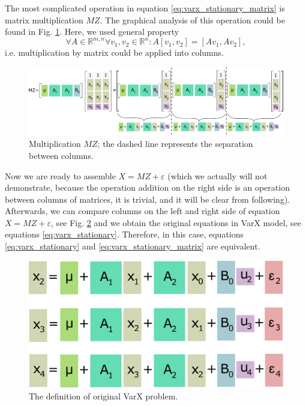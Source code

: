  The most complicated operation in equation \eqref{eq:varx_stationary_matrix} is matrix multiplication $MZ$. The graphical analysis of this operation could be found in Fig. \ref{fig:varx3}.
 Here, we used general property
 \begin{displaymath}
  \forall A \in \mathbb{R}^{m,n} \forall v_1,v_2 \in \mathbb{R}^n: A\left[ v_1, v_2 \right ] = \left[ A v_1, Av_2 \right] ,
 \end{displaymath}
 i.e. multiplication by matrix could be applied into columns.

 \begin{figure}[h!]
  \centering
    \includegraphics[scale=0.2]{figure/varx3.pdf}
  \caption{Multiplication $MZ$; the dashed line represents the separation between columns.}
  \label{fig:varx3}
 \end{figure}
 
 Now we are ready to assemble $X = MZ + \varepsilon$ (which we actually will not demonstrate, because the operation addition on the right side is an operation between columns of matrices, it is trivial, and it will be clear from following).
 Afterwards, we can compare columns on the left and right side of equation $X = MZ + \varepsilon$, see Fig. \ref{fig:varx4} and we obtain the original equations in VarX model, see equations \eqref{eq:varx_stationary}.
 Therefore, in this case, equations \eqref{eq:varx_stationary} and \eqref{eq:varx_stationary_matrix} are equivalent.

 \begin{figure}[h!]
  \centering
    \includegraphics[scale=0.2]{figure/varx4.pdf}
  \caption{The definition of original VarX problem.}
  \label{fig:varx4}
 \end{figure}

